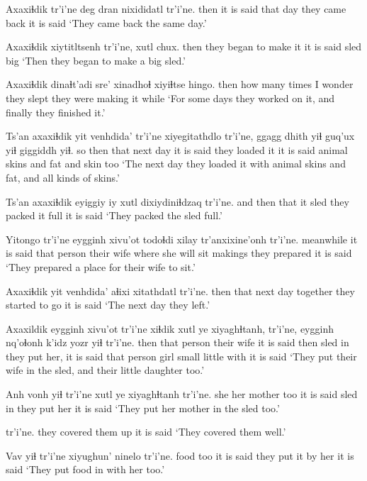 \documentclass[12pt]{article}
\begin{document}
\gll Axaxiɬdik tr'i'ne deg dran nixididatl  tr'i'ne.
then  {it is said} that day {they came back} {it is said}
\glt `They came back the same day.'
\glend

\gll Axaxiɬdik xiytitltsenh  tr'i'ne, xutl chux.
then  {they began to make it} {it is said} sled big
\glt `Then they began to make a big sled.'
\glend

\gll Axaxiɬdik dinaɬt'adi  sre'  xinadhoɬ xiyiɬtse  hingo.
then  {how many times} {I wonder} {they slept} {they were making it} while
\glt `For some days they worked on it, and finally they finished it.'
\glend

\gll Ts'an axaxiɬdik yit venhdida' tr'i'ne xiyegitathdlo tr'i'ne, ggagg  dhith yiɬ guq'ux yiɬ giggiddh yiɬ.
so then that {next day} {it is said} {they loaded it}  {it is said} animal  skins and fat  and skin too
\glt `The next day they loaded it with animal skins and fat, and all kinds of skins.'
\glend

\gll Ts'an axaxiɬdik eyiggiy iy xutl dixiydiniɬdzaq tr'i'ne.
and then  that  it sled {they packed it full} {it is said}
\glt `They packed the sled full.'
\glend

\gll Yitongo tr'i'ne eygginh xivu'ot  todoɬdi xilay tr'anxixine'onh tr'i'ne.
meanwhile {it is said} {that person} {their wife} {where she will sit} makings {they prepared} {it is said}
\glt `They prepared a place for their wife to sit.'
\glend

\gll Axaxiɬdik yit venhdida' aɬixi  xitathdatl  tr'i'ne.
then  that {next day} together {they started to go} {it is said}
\glt `The next day they left.'
\glend

\gll Axaxildik eygginh xivu'ot tr'i'ne xiɬdik xutl ye xiyaghɬtanh, tr'i'ne, eygginh nq'oɬonh k'idz yozr yiɬ tr'i'ne.
then {that person} {their wife} {it is said} then sled in {they put her,} {it is said} {that person} girl small little with {it is said}
\glt `They put their wife in the sled, and their little daughter too.'
\glend

\gll Anh vonh  yiɬ tr'i'ne xutl ye xiyaghɬtanh tr'i'ne.
she {her mother} too {it is said} sled in {they put her} {it is said}
\glt `They put her mother in the sled too.'
\glend

  tr'i'ne.
{they covered them up}  {it is said}
\glt `They covered them well.'
\glend

\gll Vav yiɬ tr'i'ne {xiyughun' ninelo} tr'i'ne.
food too {it is said} {they put it by her} {it is said}
\glt `They put food in with her too.'
\glend
\end{document}
